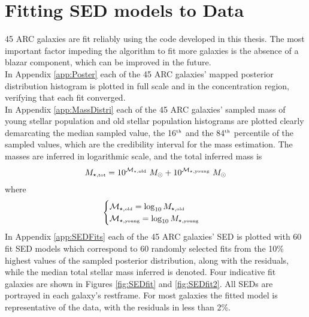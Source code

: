 \section{Fitting SED models to Data}

45 ARC galaxies are fit reliably using the code developed in this thesis. The most important factor impeding the algorithm to fit more galaxies is the absence of a blazar component, which can be improved in the future.\\ 
In Appendix \ref{app:Poster} each of the 45 ARC galaxies' mapped posterior distribution histogram is plotted in full scale and in the concentration region, verifying that each fit converged.\\
In Appendix \ref{app:MassDistri} each of the 45 ARC galaxies' sampled mass of young stellar population and old stellar population histograms are plotted clearly demarcating the median sampled value, the 16$^{\mbox{\tiny{th}}}$ and the 84$^{\mbox{\tiny{th}}}$ percentile of the sampled values, which are the credibility interval for the mass estimation. The masses are inferred in logarithmic scale, and the total inferred mass is $$ M_{\star, \mbox{\tiny{tot}} } = 10^{\mathcal{M}_{\star, \mbox{\tiny{old}} }} \; M_\odot + 10^{\mathcal{M}_{\star, \mbox{\tiny{young}} }} \; M_\odot$$ 
where 
\begin{equation*}
    \begin{cases}
        \mathcal{M}_{\star, \mbox{\tiny{old}} }= \log_{10} {M}_{\star, \mbox{\tiny{old}} }\\
        \mathcal{M}_{\star, \mbox{\tiny{young}} }= \log_{10} {M}_{\star, \mbox{\tiny{young}} }
    \end{cases}
\end{equation*}
In Appendix \ref{app:SEDFits} each of the 45 ARC galaxies' SED is plotted with 60 fit SED models which correspond to 60 randomly selected fits from the 10\% highest values of the sampled posterior distribution, along with the residuals, while the median total stellar mass inferred is denoted. Four indicative fit galaxies are shown in Figures \ref{fig:SEDfit} and \ref{fig:SEDfit2}.
All SEDs are portrayed in each galaxy's restframe. For most galaxies the fitted model is representative of the data, with the residuals in less than 2\%. 

